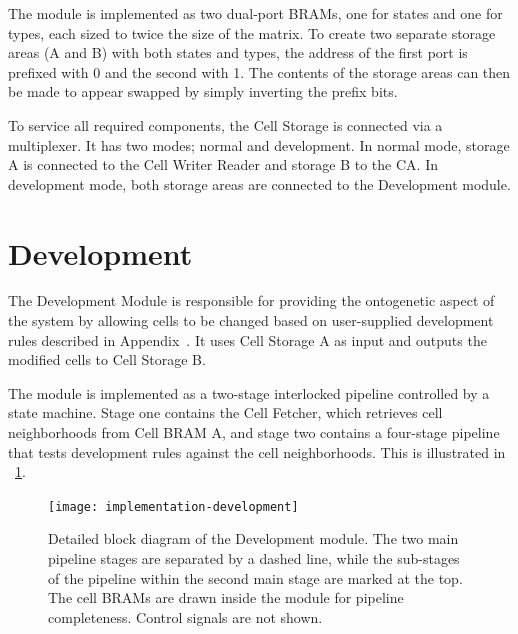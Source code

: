 The module is implemented as two dual-port BRAMs, one for states and one for types, each sized to twice the size of the matrix.
To create two separate storage areas (A and B) with both states and types, the address of the first port is prefixed with 0 and the second with 1.
The contents of the storage areas can then be made to appear swapped by simply inverting the prefix bits.

To service all required components, the Cell Storage is connected via a multiplexer.
It has two modes; normal and development.
In normal mode, storage A is connected to the Cell Writer Reader and storage B to the CA.
In development mode, both storage areas are connected to the Development module.



\section{Development}
\label{sec:development}

The Development Module is responsible for providing the ontogenetic aspect of the system by allowing cells to be changed based on user-supplied development rules described in Appendix~.
It uses Cell Storage A as input and outputs the modified cells to Cell Storage B.

The module is implemented as a two-stage interlocked pipeline controlled by a state machine.
Stage one contains the Cell Fetcher, which retrieves cell neighborhoods from Cell BRAM A, and stage two contains a four-stage pipeline that tests development rules against the cell neighborhoods.
This is illustrated in \figurename~\ref{fig:implementation-development}.

\begin{figure}[!ht]
    \hspace{-0.05\textwidth}
    \texttt{[image: implementation-development]}
    \caption[Development module]{
        Detailed block diagram of the Development module.
        The two main pipeline stages are separated by a dashed line,
        while the sub-stages of the pipeline within the second main stage are marked at the top.
        The cell BRAMs are drawn inside the module for pipeline completeness.
        Control signals are not shown.
    }
    \label{fig:implementation-development}
\end{figure}

